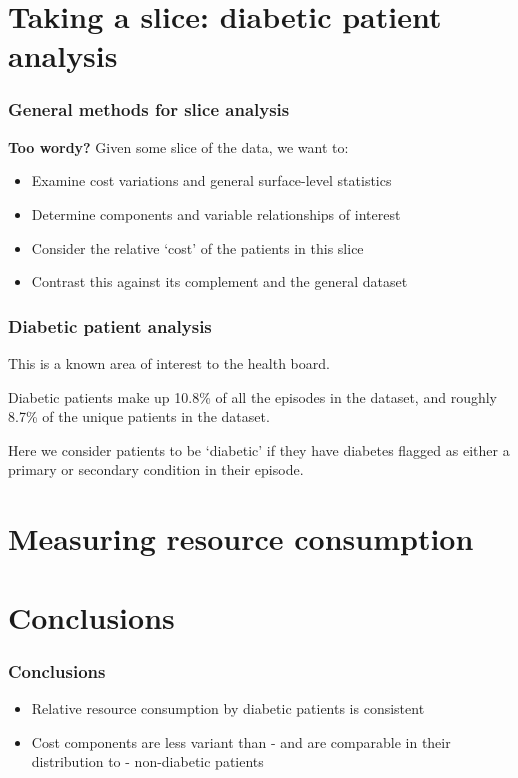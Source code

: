 \section{Taking a slice: diabetic patient analysis}

\begin{frame}
    \frametitle{General methods for slice analysis}
    \textbf{Too wordy?}
    Given some slice of the data, we want to:
    \begin{itemize}
        \item Examine cost variations and general surface-level statistics
        \item Determine components and variable relationships of interest
        \item Consider the relative `cost' of the patients in this slice
        \item Contrast this against its complement and the general dataset
    \end{itemize}
\end{frame}

\begin{frame}
    \frametitle{Diabetic patient analysis}

    This is a known area of interest to the health board.

    \vspace{10pt}
    Diabetic patients make up 10.8\% of all the episodes in the dataset, and
    roughly 8.7\% of the unique patients in the dataset.

    \vspace{10pt}
    Here we consider patients to be `diabetic' if they have diabetes flagged as
    either a primary or secondary condition in their episode.
\end{frame}



%

\section{Measuring resource consumption}


\section{Conclusions}
\begin{frame}
    \frametitle{Conclusions}

    \begin{itemize}
        \item Relative resource consumption by diabetic patients is consistent
        \item Cost components are less variant than \-- and are comparable in
            their distribution to \-- non-diabetic patients
    \end{itemize}
\end{frame}
